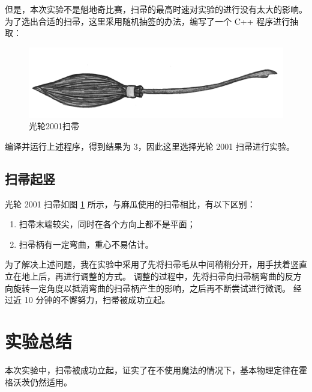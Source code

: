 \documentclass[12pt,a4paper,UTF8]{article}
\begin{document}
  但是，本次实验不是魁地奇比赛，扫帚的最高时速对实验的进行没有太大的影响。
  为了选出合适的扫帚，这里采用随机抽签的办法，编写了一个 C++ 程序进行抽取：

  

  \begin{landscape}
    \begin{figure}
      \centering
      \includegraphics[width=\linewidth]{Nimbus2001}
      \caption{光轮2001扫帚}
      \label{Nimbus2001}
    \end{figure}
  \end{landscape}

  编译并运行上述程序，得到结果为 3，因此这里选择光轮 2001 扫帚进行实验。

  \subsection{扫帚起竖}
  光轮 2001 扫帚如图 \ref{Nimbus2001} 所示，与麻瓜使用的扫帚相比，有以下区别：
  \begin{enumerate}
    \item 扫帚末端较尖，同时在各个方向上都不是平面；
    \item 扫帚柄有一定弯曲，重心不易估计。
  \end{enumerate}

  为了解决上述问题，我在实验中采用了先将扫帚毛从中间稍稍分开，用手扶着竖直立在地上后，再进行调整的方式。
  调整的过程中，先将扫帚向扫帚柄弯曲的反方向旋转一定角度以抵消弯曲的扫帚柄产生的影响，之后再不断尝试进行微调。
  经过近 10 分钟的不懈努力，扫帚被成功立起。

  \section{实验总结}
  本次实验中，扫帚被成功立起，证实了在不使用魔法的情况下，基本物理定律在霍格沃茨仍然适用。
\end{document}
